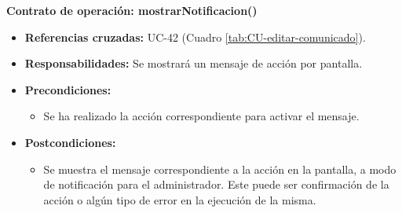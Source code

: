 \textbf{Contrato de operación: mostrarNotificacion()}
\begin{itemize}
\item \textbf{Referencias cruzadas:} UC-42 (Cuadro \ref{tab:CU-editar-comunicado}).
\item \textbf{Responsabilidades:} Se mostrará un mensaje de acción por pantalla.
\item \textbf{Precondiciones:} 
 \begin{itemize}
\item Se ha realizado la acción correspondiente para activar el mensaje.
\end {itemize}
\item \textbf{Postcondiciones:} 
 \begin{itemize}
\item Se muestra el mensaje correspondiente a la acción en la pantalla, a modo de notificación para el administrador. Este puede ser confirmación de la acción o algún tipo de error en la ejecución de la misma.
\end {itemize}
\end {itemize}




